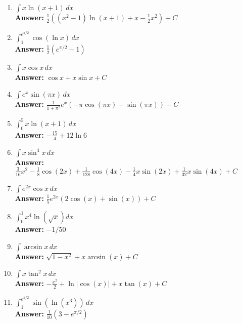 \documentclass[letterpaper]{article}
\begin{document}
\begin{enumerate}
\begin{enumerate}
	\item $\displaystyle\int x\ln(x+1)\, dx$
	\\ \textbf{Answer:} $\frac12 ((x^2-1)\ln (x+1) +x-\frac12 x^2)+C$

	\item $\int_1^{e^{\pi/2}} \cos (\ln x)\,dx$
	\\ \textbf{Answer:} $\frac12 (e^{\pi/2}-1)$

	\item $\displaystyle\int x\cos x\,dx$
	\\ \textbf{Answer:} $\cos x + x\sin x +C$

	\item $\displaystyle\int e^x \sin (\pi x)\,dx$
	\\ \textbf{Answer:} $\frac1{1+\pi^2} e^x(-\pi \cos(\pi x)+\sin(\pi x))+C$

	\item $\displaystyle\int_0^5 x\ln (x+1)\,dx$
	\\ \textbf{Answer:} $-\frac{15}4+12\ln 6$

	\item $\int x \sin^4 x\,dx$
	\\ \textbf{Answer:} $\frac{3}{16}x^2-\frac{1}{8} \cos(2 x)+\frac{1}{128} \cos(4 x)-\frac{1}{4} x \sin(2 x)+\frac{1}{32} x \sin(4 x)+C$

	\item $\int e^{2x} \cos x \,dx$
	\\ \textbf{Answer:} $\frac{1}{5} e^{2 x} (2 \cos(x)+\sin(x))+C$

	\item $\int_0^1 x^4 \ln(\sqrt x) dx$
	\\ \textbf{Answer:} $-1/50$

	\item $\int \arcsin x \, dx$
	\\ \textbf{Answer:} $\sqrt{1-x^2}+x \arcsin(x)+C$

	\item $\int x \tan^2 x\,dx$
	\\ \textbf{Answer:} $-\frac{x^2}{2}+\ln|\cos(x)|+x \tan(x)+C$

	\item $\int_1^{e^{\pi/2}} \sin (\ln (x^3))\,dx$
	\\ \textbf{Answer:} $\frac{1}{10} \left(3-e^{\pi /2}\right)$


\end{enumerate}
\end{enumerate}
\end{document}
